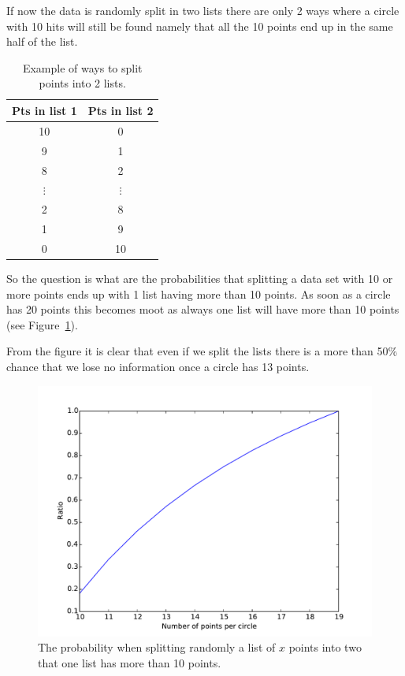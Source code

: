 \documentclass[11pt,twoside]{scrreprt}
\begin{document}
If now the data is randomly split in two lists there are only 2 ways where
a circle with 10 hits will still be found namely that all the 10 points end
up in the same half of the list.
  \begin{table}[tb]
  \centering
  \caption{Example of ways to split points into 2 lists.}
    \label{tab:point_split}
  \begin{tabular}{cc}
  \toprule
  \textbf{Pts in list 1} & \textbf{Pts in list 2} \\
  \midrule
     10 & 0 \\
     9  & 1 \\
     8  & 2 \\
     $\vdots$ & $\vdots$ \\
     2 & 8\\
     1 & 9\\
     0 & 10 \\
  \bottomrule
  \end{tabular}

\end{table}

So the question is what are the probabilities that splitting a data set with
10 or more points ends up with 1 list having more than 10 points. As soon as
a circle has 20 points this becomes moot as always one list will have more 
than 10 points (see Figure~\ref{fig:ratios}).

From the figure it is clear that even if we split the lists there is a more 
than 50\% chance that we lose no information once a circle has 13 points.
\begin{figure}[htb]
  \centering
  \includegraphics[width=\textwidth]{pics/ratio.pdf}
  \caption{The probability when splitting randomly a list of $x$ points into two that one list has more than 10 points.}
  \label{fig:ratios}
\end{figure}
\end{document}
